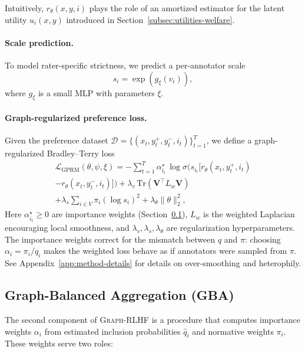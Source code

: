 \documentclass{article}
\theoremstyle{plain}
\theoremstyle{definition}
\theoremstyle{remark}
\begin{document}
Intuitively, $r_\theta(x,y,i)$ plays the role of an amortized estimator for
the latent utility $u_i(x,y)$ introduced in
Section~\ref{subsec:utilities-welfare}.

\paragraph{Scale prediction.}
To model rater-specific strictness, we predict a per-annotator scale
\begin{equation}
    s_i = \exp(g_\xi(v_i)),
    \label{eq:scale}
\end{equation}
where $g_\xi$ is a small MLP with parameters $\xi$.

\paragraph{Graph-regularized preference loss.}

Given the preference dataset
$\mathcal{D} = \{(x_t, y_t^+, y_t^-, i_t)\}_{t=1}^T$, we define a
graph-regularized Bradley--Terry loss
\begin{align}
    \mathcal{L}_{\text{GPRM}}(\theta, \psi, \xi)
    =
    - \sum_{t=1}^T
    \alpha_{i_t}^\star \,
    \log \sigma\Big(
        s_{i_t} \big[
        r_\theta(x_t, y_t^+, i_t) \nonumber \\
        -
        r_\theta(x_t, y_t^-, i_t)
        \big]
    \Big)
    + \lambda_v \, \mathrm{Tr}(\mathbf{V}^\top L_w \mathbf{V}) \nonumber \\
    + \lambda_s \sum_{i \in V} \pi_i (\log s_i)^2
    + \lambda_\theta \|\theta\|_2^2,
    \label{eq:gprm-loss}
\end{align}
Here $\alpha_{i_t}^\star \ge 0$ are importance weights (Section~\ref{subsec:gba}), $L_w$ is the weighted Laplacian encouraging local smoothness, and $\lambda_v, \lambda_s, \lambda_\theta$ are regularization hyperparameters. The importance weights correct for the mismatch between $q$ and $\pi$: choosing $\alpha_i = \pi_i / q_i$ makes the weighted loss behave as if annotators were sampled from $\pi$. See Appendix~\ref{app:method-details} for details on over-smoothing and heterophily.

\subsection{Graph-Balanced Aggregation (GBA)}
\label{subsec:gba}

The second component of \textsc{Graph-RLHF} is a procedure that computes
importance weights $\alpha_i$ from estimated inclusion probabilities
$\hat q_i$ and normative weights $\pi_i$. These weights serve two roles:
\end{document}
